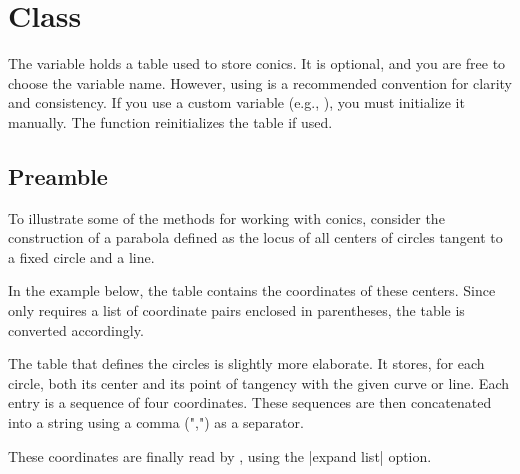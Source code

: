 \newpage

\section{Class }
The variable  holds a table used to store conics. It is optional, and you are free to choose the variable name. However, using  is a recommended convention for clarity and consistency. If you use a custom variable (e.g., ), you must initialize it manually. The  function reinitializes the  table if used.


\subsection{Preamble}
To illustrate some of the methods for working with conics, consider the construction of a parabola defined as the locus of all centers of circles tangent to a fixed circle and a line.

In the example below, the table  contains the coordinates of these centers. Since \TIKZ{} only requires a list of coordinate pairs enclosed in parentheses, the table is converted accordingly.

The table that defines the circles is slightly more elaborate. It stores, for each circle, both its center and its point of tangency with the given curve or line. Each entry is a sequence of four coordinates. These sequences are then concatenated into a string using a comma (",") as a separator.

These coordinates are finally read by , using the |expand list| option.

\vspace{1em}
\begin{center}
\end{center}


